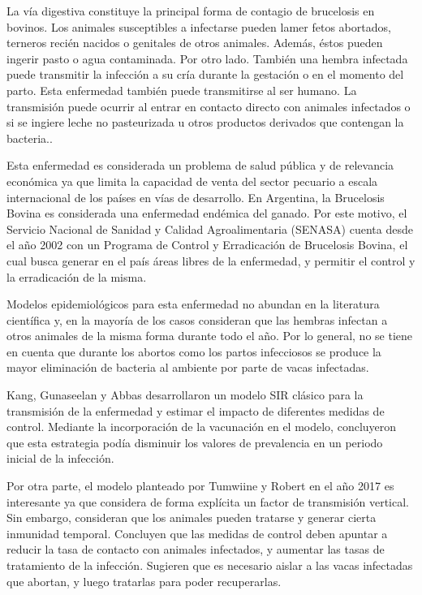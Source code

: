 \documentclass[12pt,preprint,times]{elsarticle}
\begin{document}
La vía digestiva constituye la principal forma de contagio de brucelosis en bovinos. Los animales susceptibles a infectarse  pueden lamer  fetos abortados, terneros recién nacidos o genitales de otros animales. Además, éstos pueden ingerir  pasto o agua contaminada. Por otro lado. También  una  hembra infectada puede transmitir la infección a su cría  durante la gestación o en el momento del parto. Esta enfermedad también  puede transmitirse al ser humano. La transmisión puede ocurrir  al entrar en contacto directo con animales infectados o si se ingiere leche no pasteurizada  u otros productos derivados  que contengan la bacteria.\cite{SENASA2014, OIEbrucelosis, world2006control}. 


 

Esta enfermedad es considerada un problema de salud pública y de relevancia económica ya que limita la capacidad de venta del sector pecuario a escala internacional de los países en vías de desarrollo. En Argentina, la Brucelosis Bovina es considerada una enfermedad endémica del ganado. Por este motivo, el Servicio Nacional de Sanidad y Calidad Agroalimentaria (SENASA) cuenta desde el año 2002 con un Programa de Control y Erradicación de Brucelosis Bovina, el cual busca generar en el país áreas libres de la enfermedad, y permitir el control y la erradicación de la misma. 


Modelos epidemiológicos para esta enfermedad no abundan en la literatura científica y, en la mayoría de los casos consideran que las hembras infectan a otros animales de la misma forma durante todo el año. Por lo general, no se tiene en cuenta  que durante los abortos como los partos infecciosos se produce la  mayor eliminación de bacteria al ambiente por parte de  vacas infectadas.


Kang, Gunaseelan y Abbas\cite{kang2014} desarrollaron un  modelo SIR clásico para la transmisión de la enfermedad y estimar el impacto de diferentes medidas de control. Mediante la incorporación de la vacunación en el modelo, concluyeron que esta estrategia podía disminuir los valores de prevalencia en un periodo inicial de la infección. 

Por otra parte, el modelo planteado por Tumwiine y Robert en el año 2017 \cite{tumwiine2017} es interesante ya que considera de forma explícita un factor de transmisión vertical. Sin embargo, consideran que los animales pueden tratarse y generar cierta inmunidad temporal. Concluyen que las medidas de control deben apuntar a reducir la tasa de contacto con animales infectados, y aumentar las tasas de tratamiento de la infección. Sugieren que es necesario aislar a las vacas infectadas que abortan, y luego tratarlas para poder recuperarlas.  
\end{document}
